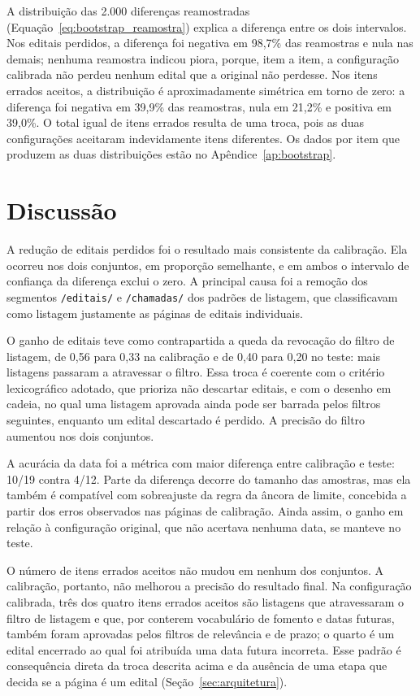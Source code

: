 A distribuição das 2.000 diferenças reamostradas
(Equação~\ref{eq:bootstrap_reamostra}) explica a diferença entre os dois
intervalos. Nos editais perdidos, a diferença foi negativa em 98,7\% das reamostras e nula nas demais; nenhuma
reamostra indicou piora, porque, item a item, a configuração calibrada não
perdeu nenhum edital que a original não perdesse. Nos itens errados aceitos, a
distribuição é aproximadamente simétrica em torno de zero: a diferença foi
negativa em 39,9\% das reamostras, nula em 21,2\% e positiva em 39,0\%. O
total igual de itens errados resulta de uma troca, pois as duas configurações
aceitaram indevidamente itens diferentes. Os dados por item que produzem as
duas distribuições estão no Apêndice~\ref{ap:bootstrap}.

\section{Discussão}
\label{sec:discussao}

A redução de editais perdidos foi o resultado mais consistente da calibração.
Ela ocorreu nos dois conjuntos, em proporção semelhante, e em ambos o intervalo
de confiança da diferença exclui o zero. A principal causa foi a remoção dos
segmentos \texttt{/editais/} e \texttt{/chamadas/} dos padrões de listagem, que
classificavam como listagem justamente as páginas de editais individuais.

O ganho de editais teve como contrapartida a queda da revocação do filtro de
listagem, de 0,56 para 0,33 na calibração e de 0,40 para 0,20 no teste: mais
listagens passaram a atravessar o filtro. Essa troca é coerente com o critério
lexicográfico adotado, que prioriza não descartar editais, e com o desenho em
cadeia, no qual uma listagem aprovada ainda pode ser barrada pelos filtros
seguintes, enquanto um edital descartado é perdido. A precisão do filtro
aumentou nos dois conjuntos.

A acurácia da data foi a métrica com maior diferença entre calibração e teste:
10/19 contra 4/12. Parte da diferença decorre do tamanho das amostras, mas ela
também é compatível com sobreajuste da regra da âncora de limite, concebida a
partir dos erros observados nas páginas de calibração. Ainda assim, o ganho em
relação à configuração original, que não acertava nenhuma data, se manteve no
teste.

O número de itens errados aceitos não mudou em nenhum dos conjuntos. A
calibração, portanto, não melhorou a precisão do resultado final. Na
configuração calibrada, três dos quatro itens errados aceitos são listagens
que atravessaram o filtro de listagem e que, por conterem vocabulário de
fomento e datas futuras, também foram aprovadas pelos filtros de relevância e
de prazo; o quarto é um edital encerrado ao qual foi atribuída uma data futura
incorreta. Esse padrão é consequência direta da troca descrita acima e da
ausência de uma etapa que decida se a página é um edital
(Seção~\ref{sec:arquitetura}).

